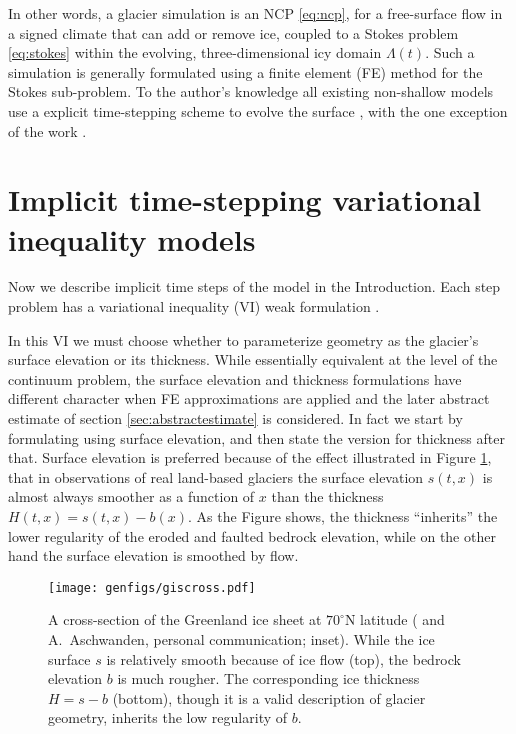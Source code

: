 \documentclass[hidelinks,onefignum,onetabnum,final]{siamart220329}  %
\begin{document}
In other words, a glacier simulation is an NCP \eqref{eq:ncp}, for a free-surface flow in a signed climate that can add or remove ice, coupled to a Stokes problem \eqref{eq:stokes} within the evolving, three-dimensional icy domain $\Lambda(t)$.  Such a simulation is generally formulated using a finite element (FE) method for the Stokes sub-problem.  To the author's knowledge all existing non-shallow models use a explicit time-stepping scheme to evolve the surface \cite[for example]{Jouvetetal2008}, with the one exception of the work \cite{WirbelJarosch2020}.  


\section{Implicit time-stepping variational inequality models} \label{sec:models}

Now we describe implicit time steps of the model in the Introduction.  Each step problem has a variational inequality (VI) weak formulation \cite{Evans2010,KinderlehrerStampacchia1980}.

In this VI we must choose whether to parameterize geometry as the glacier's surface elevation or its thickness.  While essentially equivalent at the level of the continuum problem, the surface elevation and thickness formulations have different character when FE approximations are applied and the later abstract estimate of section \ref{sec:abstractestimate} is considered.  In fact we start by formulating using surface elevation, and then state the version for thickness after that.  Surface elevation is preferred because of the effect illustrated in Figure \ref{fig:giscross}, that in observations of real land-based glaciers the surface elevation $s(t,x)$ is almost always smoother as a function of $x$ than the thickness $H(t,x) = s(t,x)-b(x)$.  As the Figure shows, the thickness ``inherits'' the lower regularity of the eroded and faulted bedrock elevation, while on the other hand the surface elevation is smoothed by flow.

\begin{figure}[ht]
\centering
\texttt{[image: genfigs/giscross.pdf]}
\caption{A cross-section of the Greenland ice sheet at $70^\circ$N latitude (\cite{Morlighemetal2017} and A.~Aschwanden, personal communication; inset).  While the ice surface $s$ is relatively smooth because of ice flow (top), the bedrock elevation $b$ is much rougher.  The corresponding ice thickness $H = s-b$ (bottom), though it is a valid description of glacier geometry, inherits the low regularity of $b$.}
\label{fig:giscross}
\end{figure}
\end{document}
